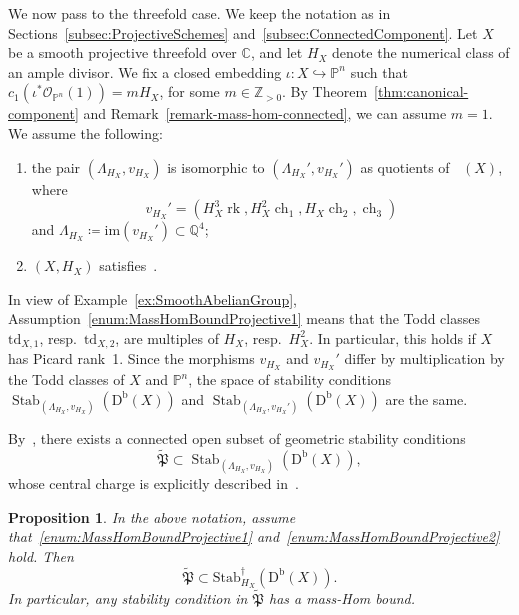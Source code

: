 \documentclass[11pt, reqno]{amsart}
\numberwithin{equation}{section}
\theoremstyle{plain}
\newtheorem{proposition}[theorem]{Proposition}
\theoremstyle{remark}
\theoremstyle{definition}
\theoremstyle{italicsname}
\newcommand{\Db}{\mathrm{D^b}}
\newcommand{\num}{\mathrm{num}}
\DeclareMathOperator{\Knum}{\rK_{\num}}
\DeclareMathOperator{\Stab}{Stab}
\newcommand{\Stabdagger}{\mathrm{Stab}^\dagger}
\DeclareMathOperator{\ch}{{ch}}
\DeclareMathOperator{\rk}{{rk}}
\newcommand{\td}{\mathrm{td}}
\newcommand{\cO}{\mathcal{O}}
\newcommand{\rK}{\mathrm{K}}
\def\CC{\ensuremath{\mathbb{C}}}
\def\QQ{\ensuremath{\mathbb{Q}}}
\def\ZZ{\ensuremath{\mathbb{Z}}}
\def\PP{\ensuremath{\mathbb{P}}}
\begin{document}
We now pass to the threefold case.
We keep the notation as in Sections~\ref{subsec:ProjectiveSchemes} and~\ref{subsec:ConnectedComponent}.
Let $X$ be a smooth projective threefold over $\CC$, and let $H_X$ denote the numerical class of an ample divisor.
We fix a closed embedding $\iota\colon X\hookrightarrow\PP^n$ such that $c_1(\iota^*\cO_{\PP^n}(1))=mH_X$, for some $m\in\ZZ_{>0}$.
By Theorem~\ref{thm:canonical-component} and Remark~\ref{remark-mass-hom-connected}, we can assume $m=1$.
We assume the following:
\begin{enumerate}[{\rm (i)}]
\item\label{enum:MassHomBoundProjective1} the pair $(\Lambda_{H_X},v_{H_X})$ is isomorphic to $(\Lambda_{H_X}',v_{H_X}')$ as quotients of $\Knum(X)$, where
\[
v_{H_X}'=\left(H_X^3\rk,H_X^2\ch_1,H_X\ch_2,\ch_3\right)
\]
and $\Lambda_{H_X}\coloneqq \mathrm{im}(v_{H_X}')\subset \QQ^4$;

\item\label{enum:MassHomBoundProjective2} $(X,H_X)$ satisfies~\cite[Conjecture 4.1]{BMS:StabCY3s}.
\end{enumerate}

In view of Example~\ref{ex:SmoothAbelianGroup}, Assumption~\ref{enum:MassHomBoundProjective1} means that the Todd classes $\td_{X,1}$, resp.~$\td_{X,2}$, are multiples of $H_X$, resp.~$H^2_X$.
In particular, this holds if $X$ has Picard rank~1.
Since the morphisms $v_{H_X}$ and $v_{H_X}'$ differ by multiplication by the Todd classes of $X$ and $\PP^n$, the space of stability conditions $\Stab_{(\Lambda_{H_X},v_{H_X})}(\Db(X))$ and $\Stab_{(\Lambda_{H_X},v_{H_X}')}(\Db(X))$ are the same.

By~\cite[Theorem 8.2]{BMS:StabCY3s}, there exists a connected open subset of geometric stability conditions
\[
\widetilde{\mathfrak P}\subset\Stab_{(\Lambda_{H_X},v_{H_X})}(\Db(X)),
\]
whose central charge is explicitly described in~\cite[Definition 8.1]{BMS:StabCY3s}.

\begin{proposition}\label{prop:BMTmassbound}
In the above notation, assume that~\ref{enum:MassHomBoundProjective1} and~\ref{enum:MassHomBoundProjective2} hold. 
Then
\[
\widetilde{\mathfrak P}\subset\Stabdagger_{H_X}(\Db(X)).
\]
In particular, any stability condition in $\widetilde{\mathfrak P}$ has a mass-Hom bound.
\end{proposition}
\end{document}
